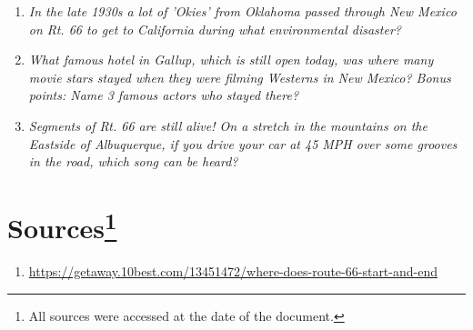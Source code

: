 \documentclass[12pt]{article}
\begin{document}
\begin{enumerate}
        \begin{addmargin}[24pt]{0in}
        \end{addmargin}
    \item{\textit{In the late 1930s a lot of 'Okies' from Oklahoma passed through New Mexico on Rt. 66 to get to California during what environmental disaster?}}
        \begin{addmargin}[24pt]{0in}
        \end{addmargin}
    \item{\textit{What famous hotel in Gallup, which is still open today, was where many movie stars stayed when they were filming Westerns in New Mexico?  Bonus points: Name 3 famous actors who stayed there?}}
        \begin{addmargin}[24pt]{0in}
        \end{addmargin}
    \item{\textit{Segments of Rt. 66 are still alive! On a stretch in the mountains on the Eastside of Albuquerque, if you drive your car at 45 MPH over some grooves in the road, which song can be heard?}}
        \begin{addmargin}[24pt]{0in}
        \end{addmargin}
\end{enumerate}

\newpage

\section*{Sources\footnote{All sources were accessed at the date of the document.}}
\begin{enumerate}
    \item{\url{https://getaway.10best.com/13451472/where-does-route-66-start-and-end}}
\end{enumerate}
\end{document}
